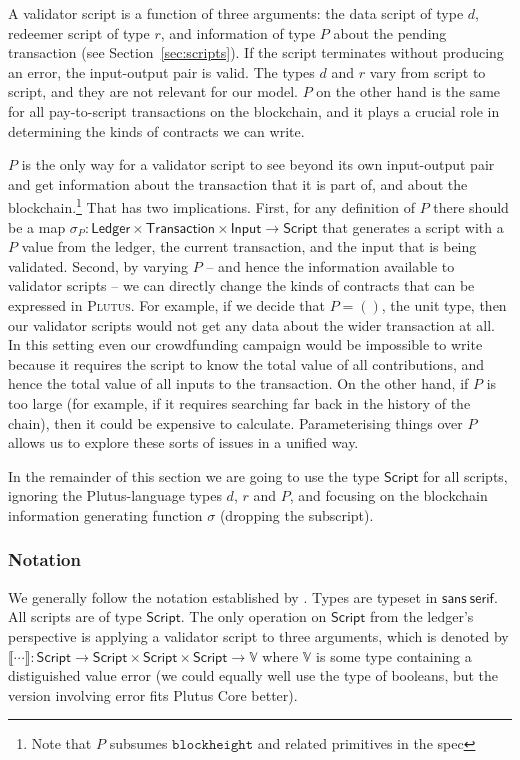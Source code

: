 \documentclass[a4paper]{article}
\theoremstyle{definition}  %
\begin{document}
A validator script is a function of three arguments: the data script
of type $d$, redeemer script of type $r$, and information of type $P$
about the pending transaction (see Section~\ref{sec:scripts}).  If the
script terminates without producing an error, the input-output pair is
valid. The types $d$ and $r$ vary from script to script, and they are
not relevant for our model. $P$ on the other hand is the same for all
pay-to-script transactions on the blockchain, and it plays a crucial
role in determining the kinds of contracts we can write.

$P$ is the only way for a validator script to see beyond its own
input-output pair and get information about the transaction that it is
part of, and about the blockchain.\footnote{Note that $P$ subsumes
  $\mathtt{blockheight}$ and related primitives in the spec} That has
two implications. First, for any definition of $P$ there should be a
map $\sigma_P : \mathsf{Ledger} \times \mathsf{Transaction} \times
\mathsf{Input} \rightarrow \mathsf{Script}$ that generates a script
with a $P$ value from the ledger, the current transaction, and the
input that is being validated. Second, by varying $P$ -- and hence
the information available to validator scripts -- we can directly
change the kinds of contracts that can be expressed in
\textsc{Plutus}. For example, if we decide that $P = ()$, the unit
type, then our validator scripts would not get any data about the
wider transaction at all. In this setting even our crowdfunding
campaign would be impossible to write because it requires the script
to know the total value of all contributions, and hence the total
value of all inputs to the transaction.  On the other hand, if $P$
is too large (for example, if it requires searching far back in the
history of the chain), then it could be expensive to calculate.
Parameterising things over $P$ allows us to explore these 
sorts of issues in a unified way.

In the remainder of this section we are going to use the type
$\mathsf{Script}$ for all scripts, ignoring the Plutus-language types
$d$, $r$ and $P$, and focusing on the blockchain information
generating function $\sigma$ (dropping the subscript).

\subsubsection{Notation}
We generally follow the notation established by
\cite{Zahnentferner18-UTxO}. Types are typeset in
$\mathsf{sans~serif}$. All scripts are of type $\mathsf{Script}$.  The
only operation on $\mathsf{Script}$ from the ledger's perspective is
applying a validator script to three arguments, which is denoted by
$\llbracket \cdots \rrbracket : \mathsf{Script} \rightarrow
\mathsf{Script} \times \mathsf{Script} \times \mathsf{Script}
\rightarrow \mathbb{V}$ where $\mathbb{V}$ is some type containing a
distiguished value \textsf{error} (we could equally well use the type
of booleans, but the version involving \textsf{error} fits Plutus Core
better).
\end{document}
